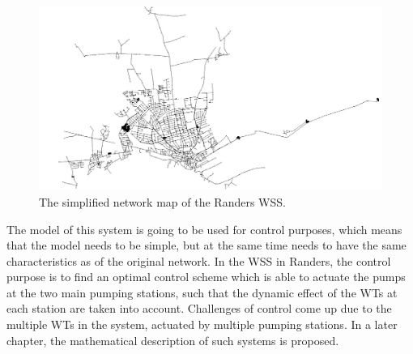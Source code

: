 \begin{figure}[H]
\centering
\includegraphics[width=1.02\textwidth]{report/pictures/verdo_pic2}
\caption{The simplified network map of the Randers WSS.}
\label{fig:simplified_network}
\end{figure}

\vspace{-3mm}
The model of this system is going to be used for control purposes, which means that the model needs to be simple, but at the same time needs to have the same characteristics as of the original network. In the WSS in Randers, the control purpose is to find an optimal control scheme which is able to actuate the pumps at the two main pumping stations, such that the dynamic effect of the WTs at each station are taken into account. Challenges of control come up due to the multiple WTs in the system, actuated by multiple pumping stations. In a later chapter, the mathematical description of such systems is proposed. 








